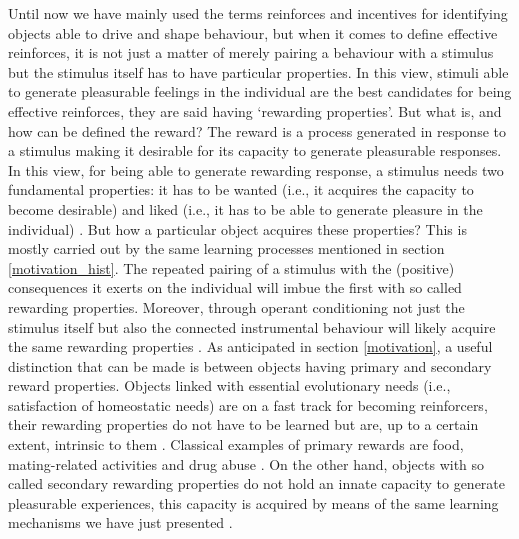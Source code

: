 Until now we have mainly used the terms reinforces and incentives for identifying objects able to drive and shape behaviour, but when it comes to define effective reinforces, it is not just a matter of merely pairing a behaviour with a stimulus but the stimulus itself has to have particular properties. In this view, stimuli able to generate pleasurable feelings in the individual are the best candidates for being effective reinforces, they are said having ‘rewarding properties’. But what is, and how can be defined the reward? The reward is a process generated in response to a stimulus making it desirable for its capacity to generate pleasurable responses. In this view, for being able to generate rewarding response, a stimulus needs two fundamental properties: it has to be wanted (i.e., it acquires the capacity to become desirable) and liked (i.e., it has to be able to generate pleasure in the individual) \cite{berridge2009dissecting}. But how a particular object acquires these properties? This is mostly carried out by the same learning processes mentioned in section \ref{motivation_hist}. The repeated pairing of a stimulus with the (positive) consequences it exerts on the individual will imbue the first with so called rewarding properties. Moreover, through operant conditioning not just the stimulus itself but also the connected instrumental behaviour will likely acquire the same rewarding properties \cite{berridge2009dissecting}. As anticipated in section \ref{motivation}, a useful distinction that can be made is between objects having primary and secondary reward properties. Objects linked with essential evolutionary needs (i.e., satisfaction of homeostatic needs) are on a fast track for becoming reinforcers, their rewarding properties do not have to be learned but are, up to a certain extent, intrinsic to them \cite{sescousse2013processing}. Classical examples of primary rewards are food, mating-related activities and drug abuse \cite{berridge2004motivation, simpson2016behavioral}. On the other hand, objects with so called secondary rewarding properties do not hold an innate capacity to generate pleasurable experiences, this capacity is acquired by means of the same learning mechanisms we have just presented \cite{sescousse2013processing}. 

